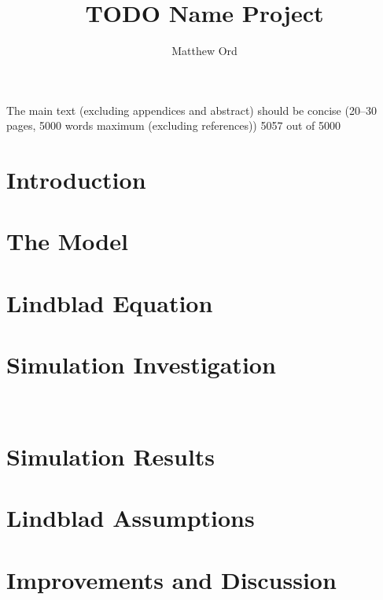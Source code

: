 \documentclass{article}
\title{TODO Name Project}
\author{Matthew Ord}
\date{}
\begin{document}
\maketitle
The main text (excluding appendices and abstract) should be concise (20–30 pages, 5000 words maximum (excluding references))
5057 out of 5000
\begin{abstract}
    
\end{abstract}



\pagebreak
\section{Introduction}


\pagebreak

\section{The Model}\label{sec:the model}


\section{Lindblad Equation}\label{sec:redfield}


\section{Simulation Investigation}\label{sec:simulation}


\FloatBarrier\
\section{Simulation Results}\label{sec:simulation results}


\section{Lindblad Assumptions}\label{sec:lindblad assumptions}


\section{Improvements and Discussion}\label{sec:improvements}

\end{document}

